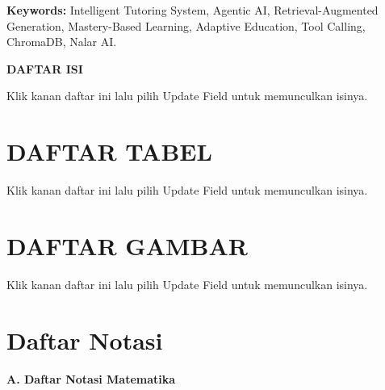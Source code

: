 \documentclass[12pt,a4paper]{article}
\begin{document}
\textbf{Keywords:} Intelligent Tutoring System, Agentic AI, Retrieval-Augmented Generation, Mastery-Based Learning, Adaptive Education, Tool Calling, ChromaDB, Nalar AI.



\newpage

\textbf{DAFTAR ISI}



Klik kanan daftar ini lalu pilih Update Field untuk memunculkan isinya.



\newpage

\section*{DAFTAR TABEL}

Klik kanan daftar ini lalu pilih Update Field untuk memunculkan isinya.



\newpage

\section*{DAFTAR GAMBAR}

Klik kanan daftar ini lalu pilih Update Field untuk memunculkan isinya.



\newpage

\section*{Daftar Notasi}

\textbf{A. Daftar Notasi Matematika}
\end{document}
